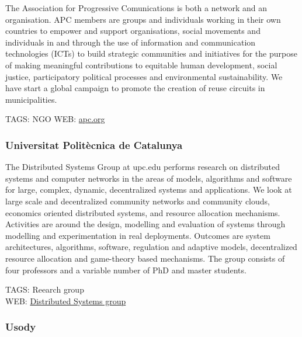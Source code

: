 \documentclass[
]{book}
\begin{document}
The Association for Progressive Comunications is both a network and an organisation. APC members are groups and individuals working in their own countries to empower and support organisations, social movements and individuals in and through the use of information and communication technologies (ICTs) to build strategic communities and initiatives for the purpose of making meaningful contributions to equitable human development, social justice, participatory political processes and environmental sustainability. We have start a global campaign to promote the creation of reuse circuits in municipalities.

TAGS: NGO
WEB: \href{http://apc.org}{apc.org}

\hypertarget{universitat-polituxe8cnica-de-catalunya}{%
\subsubsection{Universitat Politècnica de Catalunya}\label{universitat-polituxe8cnica-de-catalunya}}

The Distributed Systems Group at upc.edu performs research on distributed systems and computer networks in the areas of models, algorithms and software for large, complex, dynamic, decentralized systems and applications. We look at large scale and decentralized community networks and community clouds, economics oriented distributed systems, and resource allocation mechanisms. Activities are around the design, modelling and evaluation of systems through modelling and experimentation in real deployments. Outcomes are system architectures, algorithms, software, regulation and adaptive models, decentralized resource allocation and game-theory based mechanisms. The group consists of four professors and a variable number of PhD and master students.

TAGS: Reearch group\\
WEB: \href{https://dsg.ac.upc.edu/}{Distributed Systems group}

\hypertarget{usody}{%
\subsubsection{Usody}\label{usody}}
\end{document}
